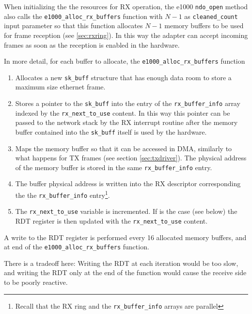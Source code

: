 \vspace{0.5cm}

When initializing the the resources for RX operation, the e1000 \texttt{ndo\_open} method also calls the \texttt{e1000\_alloc\_rx\_buffers}
function with $N-1$ as \texttt{cleaned\_count} input parameter so that this function allocates $N-1$ memory buffers to be used for frame 
reception (see \ref{sec:rxring}). In this way the adapter can accept incoming frames as soon as the reception is enabled in the hardware.

In more detail, for each buffer to allocate, the \texttt{e1000\_alloc\_rx\_buffers} function
\begin{enumerate}
    \item Allocates a new \texttt{sk\_buff} structure that has enough data room to store a maximum size ethernet frame.
    
    \item Stores a pointer to the \texttt{sk\_buff} into the entry of the \texttt{rx\_buffer\_info} array indexed by the 
	  \texttt{rx\_next\_to\_use} content. In this way this pointer can be
	  passed to the network stack by the RX interrupt routine after the memory buffer contained into the \texttt{sk\_buff} itself
	  is used by the hardware.
	  
    \item Maps the memory buffer so that it can be accessed in DMA, similarly to what happens for TX frames (see section 
	  \ref{sec:txdriver}). The physical address of the memory buffer is stored in the same \texttt{rx\_buffer\_info} entry.
	  
    \item The buffer physical address is written into the RX descriptor corresponding the the \texttt{rx\_buffer\_info} entry\footnote{
	  Recall that the RX ring and the \texttt{rx\_buffer\_info} arrays are parallel}.
	  
    \item The \texttt{rx\_next\_to\_use} variable is incremented. If is the case (see below) the RDT register is then updated with the 
	  \texttt{rx\_next\_to\_use} content.
\end{enumerate}

A write to the RDT register is performed every 16 allocated memory buffers, and at end of the \texttt{e1000\_alloc\_rx\_buffers} function.

There is a tradeoff here: Writing the RDT at each iteration would be too slow, and writing the RDT only at the end of the function would
cause the receive side to be poorly reactive.

